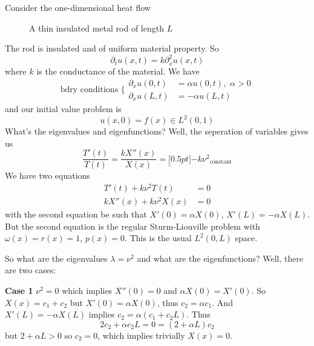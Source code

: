 \begin{ex}
Consider the one-dimensional heat flow
\begin{figure}[t]
  \begin{center}
    
  \end{center}
\caption{A thin insulated metal rod of length $L$}
\label{fig:30April2008:img1}
\end{figure}
The rod is insulated and of uniform material property. So
\begin{equation}
\partial_{t}u(x,t) = k\partial_{x}^{2}u(x,t)
\end{equation}
where $k$ is the conductance of the material. We have
\begin{equation}
\text{bdry conditions  }\bigg\{\begin{array}{rl}
\partial_{x}u(0,t) &= \alpha u(0,t),\,\,\alpha>0\\
\partial_{x}u(L,t) &= -\alpha u(L,t)
\end{array}
\end{equation}
and our initial value problem is
\begin{equation}
u(x,0) = f(x)\in L^{2}(0,1)
\end{equation}
What's the eigenvalues and eigenfunctions? Well, the
seperation of variables gives us
\begin{equation}
\frac{T'(t)}{T(t)} = \frac{kX''(x)}{X(x)} = \underbracket[0.5pt]{-k\nu^{2}}_{\text{constant}}
\end{equation}
We have two equations
\begin{subequations}
\begin{align}
T'(t)+k\nu^{2}T(t)&=0\\
kX''(x)+k\nu^{2}X(x)&=0
\end{align}
\end{subequations}
with the second equation be such that $X'(0)=\alpha X(0)$,
$X'(L)=-\alpha X(L)$. But the second equation is the regular
Sturm-Liouville problem with $\omega(x)=r(x)=1$,
$p(x)=0$. This is the usual $L^{2}(0,L)$ space.

So what are the eigenvalues $\lambda=\nu^{2}$ and what are
the eigenfunctions? Well, there are two cases:

\textbf{Case 1} $\nu^2=0$ which implies $X''(0)=0$ and
$\alpha X(0)=X'(0)$. So $X(x)=c_1 + c_2$ but $X'(0)=\alpha
X(0)$, thus $c_2 = \alpha c_1$. And $X'(L)=-\alpha X(L)$
implies $c_2 = \alpha(c_1 + c_2 L)$. Thus 
$$2c_2+\alpha c_2L=0=(2+\alpha L)c_2 $$
but $2+\alpha L>0$ so $c_2=0$, which implies trivially
$X(x)=0$.


\end{ex}
